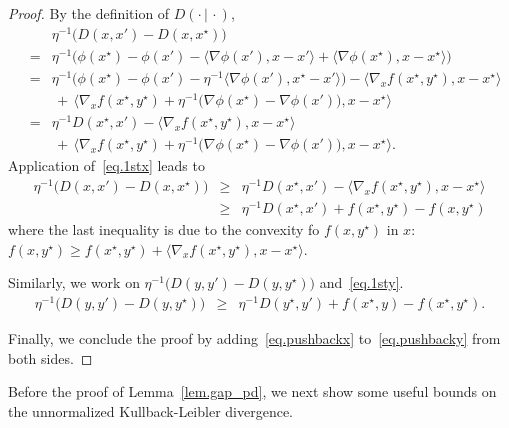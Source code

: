 \documentclass[12pt, final]{l4dc2023}
\begin{document}
\begin{proof}
	By the definition of $D(\cdot\,\vert\,\cdot)$,
	\[
	\begin{array}{rcl}
	&& \!\!\!\! \!\!\!\! \!\! 
	\eta^{-1} \big(D(x,x') - D(x,x^\star)\big)
	\\[0.2cm]
	&=&
	\eta^{-1}\big(
	\phi(x^\star) - \phi(x') - \langle \nabla\phi(x'), x-x'\rangle
	+ \langle \nabla\phi(x^\star), x-x^\star\rangle
	\big)
	\\[0.2cm]
	&=&\eta^{-1}\big(
	\phi(x^\star) - \phi(x') 
	- \eta^{-1} \langle \nabla\phi(x'), x^\star-x'\rangle 	\big)-\langle \nabla_xf(x^\star,y^\star) , x-x^\star\rangle
	\\[0.2cm]
	&&
	\,+\, \langle \nabla_xf(x^\star,y^\star) + \eta^{-1} \big(\nabla\phi(x^\star)-\nabla\phi(x')\big), x-x^\star\rangle
	\\[0.2cm]
	&=&\eta^{-1}D(x^\star,x')-\langle \nabla_xf(x^\star,y^\star) , x-x^\star\rangle
	\\[0.2cm]
	&&
	\,+\, \langle \nabla_xf(x^\star,y^\star) + \eta^{-1} \big(\nabla\phi(x^\star)-\nabla\phi(x')\big), x-x^\star\rangle.
	\end{array}
	\]
	Application of~\eqref{eq.1stx} leads to
	\begin{equation}\label{eq.pushbackx}
	\begin{array}{rcl}
	\eta^{-1} \big(D(x,x') - D(x,x^\star)\big)
	&\geq&
	\eta^{-1}D(x^\star,x')
	-\langle \nabla_xf(x^\star,y^\star) , x-x^\star\rangle
	\\[0.2cm]
	&\geq&
	\eta^{-1}D(x^\star,x')
	+  f(x^\star,y^\star)- f(x,y^\star) 
	\end{array}
	\end{equation}
	where the last inequality is due to the convexity fo $f(x,y^\star)$ in $x$:
	$f(x,y^\star)\geq f(x^\star,y^\star)+\langle\nabla_x f(x^\star,y^\star),x-x^\star\rangle$.
	
	Similarly, we work on $\eta^{-1} \big(D(y,y') - D(y,y^\star)\big)$ and~\eqref{eq.1sty}.
	\begin{equation}\label{eq.pushbacky}
	\begin{array}{rcl}
	\eta^{-1} \big(D(y,y') - D(y,y^\star)\big)
	&\geq&
	\eta^{-1}D(y^\star,y')
	+ f(x^\star,y) -  f(x^\star,y^\star).
	\end{array}
	\end{equation}
	
	Finally, we conclude the proof by adding~\eqref{eq.pushbackx} to~\eqref{eq.pushbacky} from both sides.
\end{proof}

Before the proof of Lemma~\ref{lem.gap_pd}, we next show some useful bounds on the unnormalized Kullback-Leibler divergence.
\end{document}
